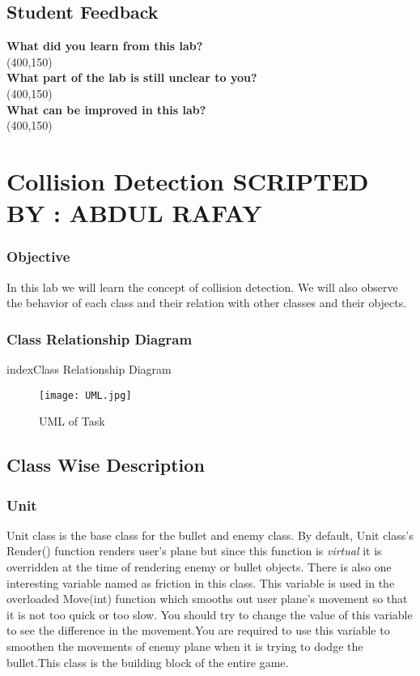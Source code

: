 \documentclass[11pt,fleqn]{book} %
\begin{document}
\newpage
\section{Student Feedback}
\textbf{What did you learn from this lab?}\\ 
\framebox(400,150){}\\
\textbf{What part of the lab is still unclear to you?}\\
\framebox(400,150){}\\
\textbf{What can be improved in this lab?}\\ 
\framebox(400,150){}\\

 
 \chapter{Collision Detection \hspace{38mm} {\textsc{\small SCRIPTED BY : ABDUL RAFAY}}}
 \subsection{Objective}
 In this lab we will learn the concept of collision detection. We will also observe the behavior of each class and their relation with other classes and their objects.
 \subsection{Class Relationship Diagram}index{Class Relationship Diagram}
 \begin{figure}[h]
 	\centering\texttt{[image: UML.jpg]}
 	\caption{UML of Task}
 \end{figure}
 \newpage
 \section{Class Wise Description}
 \subsection{Unit}
 Unit class is the base class for the bullet and enemy class. By default, Unit class's Render() function renders user's plane but since this function is \emph{virtual} it is overridden at the time of rendering enemy or bullet objects. There is also one interesting variable named as friction in this class. This variable is used in the overloaded Move(int) function which smooths out user plane's movement so that it is not too quick or too slow. You should try to change the value of this variable to see the difference in the movement.You are required to use this variable to smoothen the movements of enemy plane when it is trying to dodge the bullet.This class is the building block of the entire game.
\end{document}
